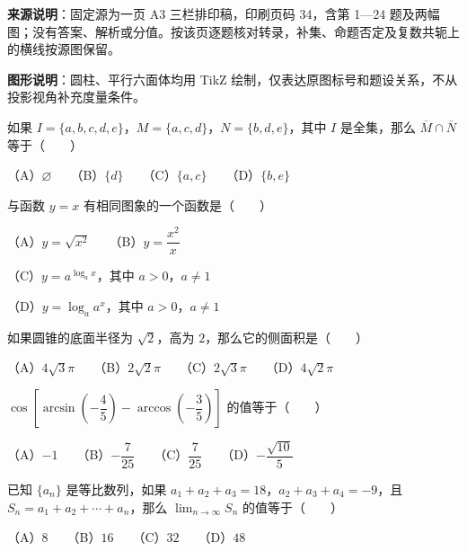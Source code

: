 


\begin{gktip}
\textbf{来源说明}：固定源为一页 A3 三栏排印稿，印刷页码 34，含第 1—24 题及两幅图；没有答案、解析或分值。按该页逐题核对转录，补集、命题否定及复数共轭上的横线按源图保留。

\textbf{图形说明}：圆柱、平行六面体均用 TikZ 绘制，仅表达原图标号和题设关系，不从投影视角补充度量条件。
\end{gktip}

\begin{question}

如果 $I=\{a,b,c,d,e\}$，$M=\{a,c,d\}$，$N=\{b,d,e\}$，其中 $I$ 是全集，那么 $\overline M\cap\overline N$ 等于\mbox{（　　）}

（A）$\varnothing$　　（B）$\{d\}$　　（C）$\{a,c\}$　　（D）$\{b,e\}$

\end{question}
\begin{question}

与函数 $y=x$ 有相同图象的一个函数是\mbox{（　　）}

（A）$y=\sqrt{x^2}$　　（B）$y=\dfrac{x^2}{x}$

（C）$y=a^{\log_a x}$，其中 $a>0$，$a\ne1$

（D）$y=\log_a a^x$，其中 $a>0$，$a\ne1$

\end{question}
\begin{question}

如果圆锥的底面半径为 $\sqrt2$，高为 $2$，那么它的侧面积是\mbox{（　　）}

（A）$4\sqrt3\pi$　　（B）$2\sqrt2\pi$　　（C）$2\sqrt3\pi$　　（D）$4\sqrt2\pi$

\end{question}
\begin{question}

$\cos\left[\arcsin\left(-\dfrac45\right)-\arccos\left(-\dfrac35\right)\right]$ 的值等于\mbox{（　　）}

（A）$-1$　　（B）$-\dfrac7{25}$　　（C）$\dfrac7{25}$　　（D）$-\dfrac{\sqrt{10}}5$

\end{question}
\begin{question}

已知 $\{a_n\}$ 是等比数列，如果 $a_1+a_2+a_3=18$，$a_2+a_3+a_4=-9$，且 $S_n=a_1+a_2+\cdots+a_n$，那么 $\displaystyle\lim_{n\to\infty}S_n$ 的值等于\mbox{（　　）}

（A）$8$　　（B）$16$　　（C）$32$　　（D）$48$

\end{question}

